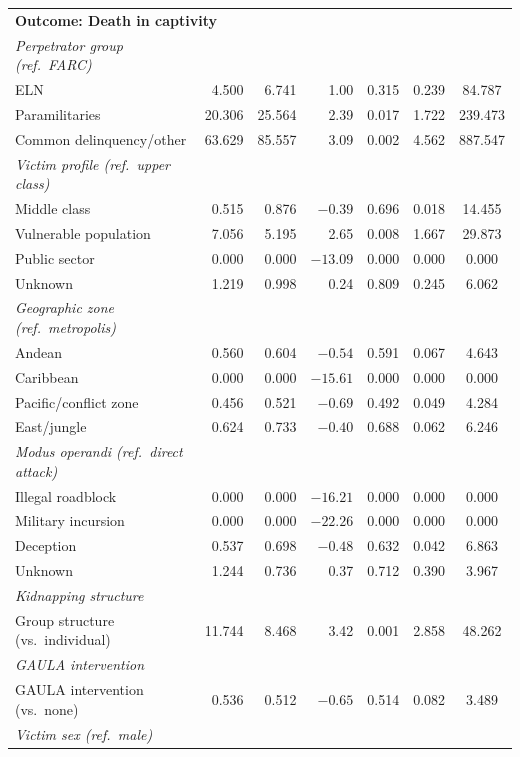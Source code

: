 {\begin{longtable}{@{}l r r r r c c@{}}
\multicolumn{7}{l}{\textbf{Outcome: Death in captivity}} \\
\textit{Perpetrator group (ref.\ FARC)} & & & & & & \\
ELN & 4.500 & 6.741 & 1.00 & 0.315 & 0.239 & 84.787 \\
Paramilitaries & 20.306 & 25.564 & 2.39 & 0.017 & 1.722 & 239.473 \\
Common delinquency/other & 63.629 & 85.557 & 3.09 & 0.002 & 4.562 & 887.547 \\
\addlinespace
\textit{Victim profile (ref.\ upper class)} & & & & & & \\
Middle class & 0.515 & 0.876 & $-0.39$ & 0.696 & 0.018 & 14.455 \\
Vulnerable population & 7.056 & 5.195 & 2.65 & 0.008 & 1.667 & 29.873 \\
Public sector & 0.000 & 0.000 & $-13.09$ & 0.000 & 0.000 & 0.000 \\
Unknown & 1.219 & 0.998 & 0.24 & 0.809 & 0.245 & 6.062 \\
\addlinespace
\textit{Geographic zone (ref.\ metropolis)} & & & & & & \\
Andean & 0.560 & 0.604 & $-0.54$ & 0.591 & 0.067 & 4.643 \\
Caribbean & 0.000 & 0.000 & $-15.61$ & 0.000 & 0.000 & 0.000 \\
Pacific/conflict zone & 0.456 & 0.521 & $-0.69$ & 0.492 & 0.049 & 4.284 \\
East/jungle & 0.624 & 0.733 & $-0.40$ & 0.688 & 0.062 & 6.246 \\
\addlinespace
\textit{Modus operandi (ref.\ direct attack)} & & & & & & \\
Illegal roadblock & 0.000 & 0.000 & $-16.21$ & 0.000 & 0.000 & 0.000 \\
Military incursion & 0.000 & 0.000 & $-22.26$ & 0.000 & 0.000 & 0.000 \\
Deception & 0.537 & 0.698 & $-0.48$ & 0.632 & 0.042 & 6.863 \\
Unknown & 1.244 & 0.736 & 0.37 & 0.712 & 0.390 & 3.967 \\
\addlinespace
\textit{Kidnapping structure} & & & & & & \\
Group structure (vs.\ individual) & 11.744 & 8.468 & 3.42 & 0.001 & 2.858 & 48.262 \\
\addlinespace
\textit{GAULA intervention} & & & & & & \\
GAULA intervention (vs.\ none) & 0.536 & 0.512 & $-0.65$ & 0.514 & 0.082 & 3.489 \\
\addlinespace
\textit{Victim sex (ref.\ male)} & & & & & & \\

\end{longtable}}
